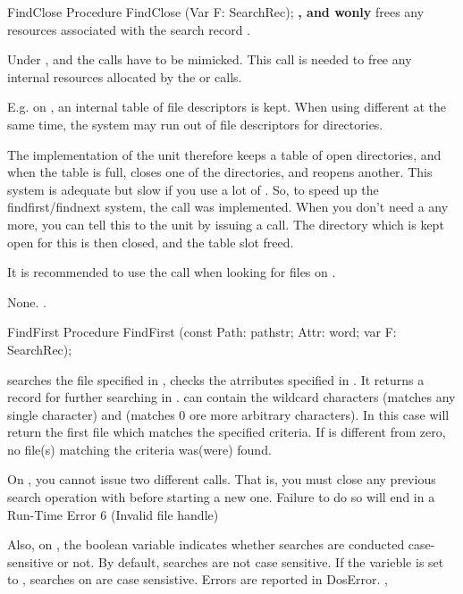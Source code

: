 \begin{procedure}{FindClose}
\Declaration
Procedure FindClose (Var F: SearchRec);
\Description
\textbf{\linux, \windows and \ostwo wonly}
 frees any resources associated with the search record
.

Under \linux, \windows and \ostwo the  calls have 
to be mimicked. This call is needed to free any internal resources allocated
by the  or  calls.

E.g. on \linux, an internal table of file descriptors is kept. 
When using different  at the same time, 
the system may run out of file descriptors for directories.

The \linux implementation of the \dos unit therefore keeps a table of open
directories, and when the table is full, closes one of the directories, and
reopens another. This system is adequate but slow if you use a lot of
.
So, to speed up the findfirst/findnext system, the  call was
implemented. When you don't need a  any more, you can tell
this to the \dos unit by issuing a  call. The directory
which is kept open for this  is then closed, and the table slot
freed.

It is recommended to use the \linux call  when looking for files 
on \linux.

\Errors
None.
\SeeAlso
{}.
\end{procedure}

\begin{procedure}{FindFirst}
\Declaration
Procedure FindFirst (const Path: pathstr; Attr: word; var F: SearchRec);
\Description

 searches the file specified in , checks the
atrributes specified in . It returns a  record for
further searching in .
 can contain the wildcard characters  (matches any single
character) and \var{*} (matches 0 ore more arbitrary characters). In this
case  will return the first file which matches the specified
criteria.
If  is different from zero, no file(s) matching the criteria 
was(were) found.

On \ostwo, you cannot issue two different  calls. That is,
you must close any previous search operation with  before
starting a new one. Failure to do so will end in a Run-Time Error 6 
(Invalid file handle)

Also, on \ostwo, the boolean variable  indicates
whether searches are conducted case-sensitive or not. By default, searches
are not case sensitive. If the varieble is set to , searches on
\ostwo are case sensistive.
\Errors
Errors are reported in DosError.
\SeeAlso
{},
\end{procedure}

